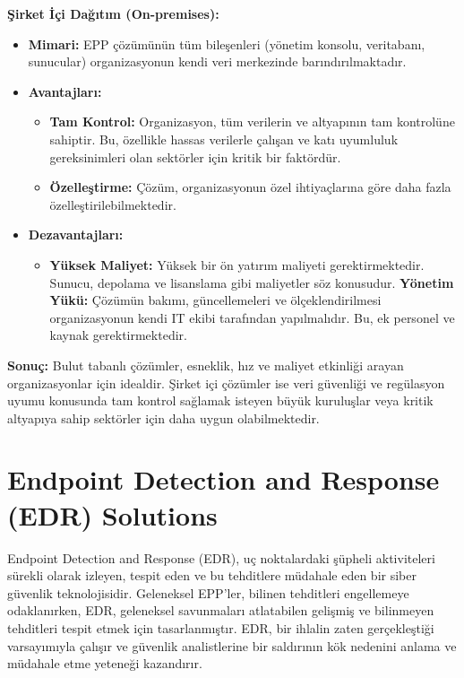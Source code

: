 \textbf{Şirket İçi Dağıtım (On-premises):}
\begin{itemize}
    \item \textbf{Mimari:} EPP çözümünün tüm bileşenleri (yönetim konsolu, veritabanı, sunucular) organizasyonun kendi veri merkezinde barındırılmaktadır.
    \item \textbf{Avantajları:}
    \begin{itemize}
        \item \textbf{Tam Kontrol:} Organizasyon, tüm verilerin ve altyapının tam kontrolüne sahiptir. Bu, özellikle hassas verilerle çalışan ve katı uyumluluk gereksinimleri olan sektörler için kritik bir faktördür.
        \item \textbf{Özelleştirme:} Çözüm, organizasyonun özel ihtiyaçlarına göre daha fazla özelleştirilebilmektedir.
    \end{itemize}
    \item \textbf{Dezavantajları:}
    \begin{itemize}
        \item \textbf{Yüksek Maliyet:} Yüksek bir ön yatırım maliyeti gerektirmektedir. Sunucu, depolama ve lisanslama gibi maliyetler söz konusudur.
        \textbf{Yönetim Yükü:} Çözümün bakımı, güncellemeleri ve ölçeklendirilmesi organizasyonun kendi IT ekibi tarafından yapılmalıdır. Bu, ek personel ve kaynak gerektirmektedir.
    \end{itemize}
\end{itemize}

\textbf{Sonuç:} Bulut tabanlı çözümler, esneklik, hız ve maliyet etkinliği arayan organizasyonlar için idealdir. Şirket içi çözümler ise veri güvenliği ve regülasyon uyumu konusunda tam kontrol sağlamak isteyen büyük kuruluşlar veya kritik altyapıya sahip sektörler için daha uygun olabilmektedir.

\newpage

\section{Endpoint Detection and Response (EDR) Solutions}

Endpoint Detection and Response (EDR), uç noktalardaki şüpheli aktiviteleri sürekli olarak izleyen, tespit eden ve bu tehditlere müdahale eden bir siber güvenlik teknolojisidir. Geleneksel EPP'ler, bilinen tehditleri engellemeye odaklanırken, EDR, geleneksel savunmaları atlatabilen gelişmiş ve bilinmeyen tehditleri tespit etmek için tasarlanmıştır. EDR, bir ihlalin zaten gerçekleştiği varsayımıyla çalışır ve güvenlik analistlerine bir saldırının kök nedenini anlama ve müdahale etme yeteneği kazandırır.

